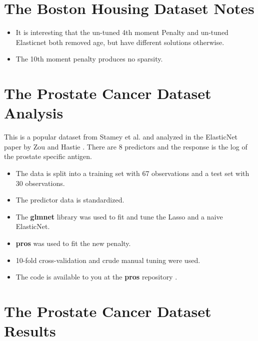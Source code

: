 \documentclass[10pt, reqno]{article}
\numberwithin{equation}{section}
\begin{document}
\newpage
\section*{The Boston Housing Dataset Notes}

\begin{itemize}
\item It is interesting that the un-tuned 4th moment Penalty and un-tuned Elasticnet both removed age, but have different solutions otherwise.

\item The 10th moment penalty produces no sparsity.
\end{itemize}

\newpage
\section*{The Prostate Cancer Dataset Analysis}

This is a popular dataset from Stamey et al. \cite{prostate} and analyzed in the ElasticNet paper by Zou and Hastie \cite{elasticnet}.
There are 8 predictors and the response is the log of the prostate specific antigen.

\begin{itemize}
\item The data is split into a training set with 67 observations and a test set with 30 observations.

\item The predictor data is standardized.

\item The \textbf{glmnet} \cite{glmnet} library was used to fit and tune the Lasso and a naive ElasticNet.

\item \textbf{pros} \cite{pros} was used to fit the new penalty.

\item 10-fold cross-validation and crude manual tuning were used.

\item The code is available to you at the \textbf{pros} repository \cite{pros}.

\end{itemize}

\newpage
\section*{The Prostate Cancer Dataset Results}
\end{document}
